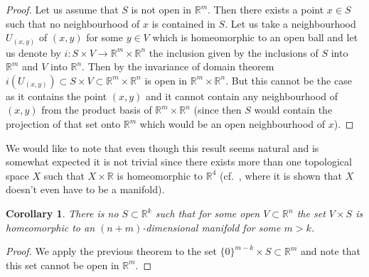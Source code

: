 \documentclass[11pt]{article}
\newtheorem{cor}[tw]{Corollary}
\begin{document}
\begin{proof} Let us assume that $S$ is not open in $\mathbb{R}^m$. Then there exists a point $x\in S$ such that no neighbourhood of $x$ is contained in $S$. Let us take a neighbourhood $U_{(x,y)}$ of $(x,y)$ for some $y\in V$ which is homeomorphic to an open ball and let us denote by $i\colon S\times V\rightarrow \mathbb{R}^m\times\mathbb{R}^n$ the inclusion given by the inclusions of $S$ into $\mathbb{R}^m$ and $V$ into $\mathbb{R}^n$. Then by the invariance of domain theorem $i(U_{(x,y)})\subset S\times V\subset \mathbb{R}^m\times\mathbb{R}^n$ is open in $\mathbb{R}^m\times\mathbb{R}^n$. But this cannot be the case as it contains the point $(x,y)$ and it cannot contain any neighbourhood of $(x,y)$ from the product basis of $\mathbb{R}^m\times\mathbb{R}^n$ (since then $S$ would contain the projection of that set onto $\mathbb{R}^m$ which would be an open neighbourhood of $x$).
\end{proof}

\begin{rem} We would like to note that even though this result seems natural and is somewhat expected it is not trivial since there exists more than one topological space $X$ such that $X\times\mathbb{R}$ is homeomorphic to $\mathbb{R}^4$ (cf.~\cite{B}, where it is shown that $X$ doesn't even have to be a manifold).
\end{rem}
\begin{cor}\label{prod2} There is no $S\subset\mathbb{R}^k$ such that for some open $V\subset\mathbb{R}^n$ the set $V\times S$ is homeomorphic to an $(n+m)$-dimensional manifold for some $m>k$.\end{cor}

\begin{proof} We apply the previous theorem to the set $\{0\}^{m-k}\times S\subset\mathbb{R}^m$ and note that this set cannot be open in $\mathbb{R}^m$.
\end{proof}
\end{document}
